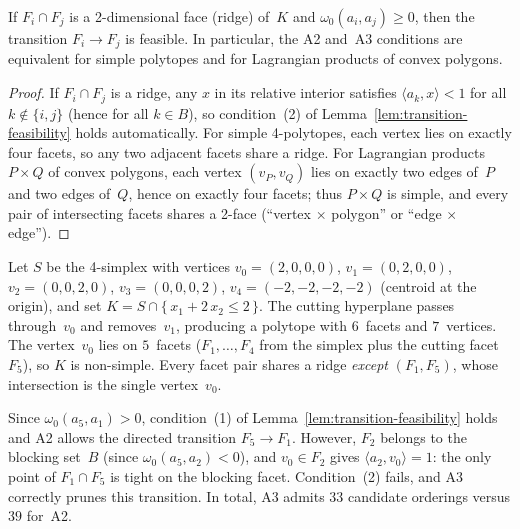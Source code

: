 \begin{unverified}
\begin{corollary}
\label{cor:ridge-sufficiency}
If\/ $F_i \cap F_j$ is a 2-dimensional face (ridge) of~$K$
and $\omega_0(a_i, a_j) \ge 0$, then the transition $F_i \to F_j$
is feasible.
In particular, the A2 and~A3 conditions are equivalent
for simple polytopes and for Lagrangian products of convex polygons.
\end{corollary}

\begin{proof}
If $F_i \cap F_j$ is a ridge, any $x$ in its relative interior satisfies
$\langle a_k, x \rangle < 1$ for all $k \notin \{i,j\}$ (hence for all $k \in B$),
so condition~(2) of Lemma~\ref{lem:transition-feasibility} holds
automatically.
For simple 4-polytopes, each vertex lies on exactly four facets,
so any two adjacent facets share a ridge.
For Lagrangian products $P \times Q$ of convex polygons,
each vertex $(v_P, v_Q)$ lies on exactly two edges of~$P$
and two edges of~$Q$, hence on exactly four facets;
thus $P \times Q$ is simple, and every pair of intersecting facets
shares a 2-face (``vertex $\times$ polygon'' or ``edge $\times$ edge'').
\end{proof}
\end{unverified}

\begin{example}
\label{ex:a3-prunes}
Let $S$ be the 4-simplex with vertices
$v_0 = (2,0,0,0)$,\; $v_1 = (0,2,0,0)$,\; $v_2 = (0,0,2,0)$,\;
$v_3 = (0,0,0,2)$,\; $v_4 = (-2,-2,-2,-2)$
(centroid at the origin), and set
$K = S \cap \{\, x_1 + 2\, x_2 \le 2 \,\}$.
The cutting hyperplane passes through~$v_0$ and removes~$v_1$,
producing a polytope with $6$~facets and $7$~vertices.
The vertex~$v_0$ lies on $5$~facets ($F_1,\ldots,F_4$ from the simplex
plus the cutting facet~$F_5$), so $K$ is non-simple.
Every facet pair shares a ridge \emph{except} $(F_1, F_5)$,
whose intersection is the single vertex~$v_0$.

Since $\omega_0(a_5, a_1) > 0$, condition~(1) of
Lemma~\ref{lem:transition-feasibility} holds and A2 allows
the directed transition $F_5 \to F_1$.
However, $F_2$ belongs to the blocking set~$B$
(since $\omega_0(a_5, a_2) < 0$), and $v_0 \in F_2$
gives $\langle a_2, v_0 \rangle = 1$:
the only point of $F_1 \cap F_5$ is tight on the blocking facet.
Condition~(2) fails, and A3 correctly prunes this transition.
In total, A3 admits $33$ candidate orderings versus $39$ for~A2.
\end{example}

